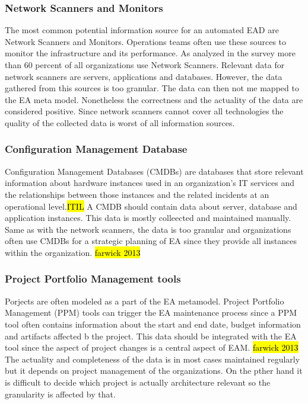 \subsubsection{Network Scanners and Monitors}
The most common potential information source for an automated EAD are Network Scanners and Monitors. Operations teams often use these sources to monitor the infrastructure and its performance. As analyzed in the survey more than 60 percent of all organizations use Network Scanners.
Relevant data for network scanners are servers, applications and databases. However, the data gathered from this sources is too granular. The data can then not me mapped to the EA meta model. Nonetheless the correctness and the actuality of the data are considered positive. Since network scanners cannot cover all technologies the quality  of the collected data is worst of all information sources.

\subsubsection{Configuration Management Database}
Configuration Management Databases (CMDBs) are databases that store relevant information about hardware instances used in an organization's IT services and the relationships between those instances and the related incidents at an operational level.\hl{ITIL}
A CMDB should contain data about server, database and application instances. This data is mostly colleected and maintained manually. Same as with the network scanners, the data is too granular and organizations often use CMDBs for a strategic planning of EA since they provide all instances within the organization. \hl{farwick 2013}

\subsubsection{Project Portfolio Management tools}
Porjects are often modeled as a part of the EA metamodel. Project Portfolio Management (PPM) tools can trigger the EA maintenance process since a PPM tool often contains information about the start and end date, budget information and artifacts affected b the project. This data should be integrated with the EA tool since the aspect of project changes is a central aspect of EAM. \hl{farwick 2013}
The actuality and completeness of the data is in most cases maintained regularly but it depends on project management of the organizations. On the pther hand it is difficult to decide which project is actually architecture relevant so the granularity is affected by that.


